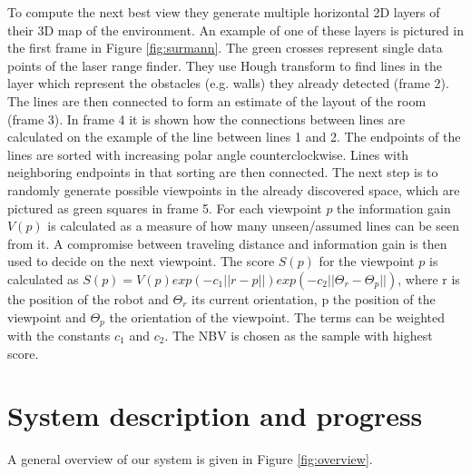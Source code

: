 \documentclass[a4paper,11pt,english]{article}
\begin{document}
To compute the next best view they generate multiple horizontal 2D layers of their 3D map of the environment.
An example of one of these layers is pictured in the first frame in Figure \ref{fig:surmann}.
The green crosses represent single data points of the laser range finder.
They use Hough transform to find lines in the layer which represent the obstacles (e.g. walls) they already detected (frame 2).
The lines are then connected to form an estimate of the layout of the room (frame 3).
In frame 4 it is shown how the connections between lines are calculated on the example of the line between lines 1 and 2. 
The endpoints of the lines are sorted with increasing polar angle counterclockwise.
Lines with neighboring endpoints in that sorting are then connected.
The next step is to randomly generate possible viewpoints in the already discovered space, which are pictured as green squares in frame 5.
For each viewpoint $p$ the information gain $V(p)$ is calculated as a measure of how many unseen/assumed lines can be seen from it.
A compromise between traveling distance and information gain is then used to decide on the next viewpoint.
The score $S(p)$ for the viewpoint $p$ is calculated as $S(p) = V(p) exp(-c_1||r-p||)exp(-c_2||\Theta_r-\Theta_p||)$, where r is the position of the robot and $\Theta_r$ its current orientation, p the position of the viewpoint and $\Theta_p$ the orientation of the viewpoint. The terms can be weighted with the constants $c_1$ and $c_2$.
The NBV is chosen as the sample with highest score.

\section{System description and progress}
\label{system}
A general overview of our system is given in Figure \ref{fig:overview}.
\end{document}
